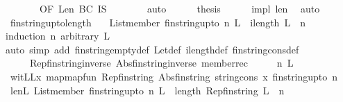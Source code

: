 \begin{isabellebody}
\ \ \ \ \ \ {\isacharcomma}\ OF\ Len\ BC\ IS{\isacharbrackright}\isanewline
\ \ \ \ \ \ \isamarkupfalse%
\ auto\isanewline
\ \ \ \ \isamarkupfalse%
\ {\isacharquery}thesis\isanewline
\ \ \ \ \isamarkupfalse%
\ impl\ len\ \isamarkupfalse%
\ auto\isanewline
{}\isamarkupfalse%
%
\endisatagproof
{\isafoldproof}%
%
\isadelimproof
\isanewline
%
\endisadelimproof
\isanewline
\isanewline
{}\isamarkupfalse%
\ fin{\isacharunderscore}string{\isacharunderscore}upto{\isacharunderscore}length{\isacharcolon}\isanewline
\ \ \ {\isachardoublequoteopen}List{\isachardot}member\ {\isacharparenleft}fin{\isacharunderscore}string{\isacharunderscore}upto\ n{\isacharparenright}\ L\ {\isasymLongrightarrow}\ ilength\ L\ {\isasymle}\ n{\isachardoublequoteclose}\isanewline
%
\isadelimproof
\ \ %
\endisadelimproof
%
\isatagproof
{}\isamarkupfalse%
{\isacharparenleft}induction\ n\ arbitrary{\isacharcolon}\ L{\isacharparenright}\isanewline
\ \ \ \isamarkupfalse%
{\isacharparenleft}auto\ simp\ add{\isacharcolon}\ fin{\isacharunderscore}string{\isacharunderscore}empty{\isacharunderscore}def\ Let{\isacharunderscore}def\ ilength{\isacharunderscore}def\ fin{\isacharunderscore}string{\isacharunderscore}cons{\isacharunderscore}def\ \isanewline
\ \ \ \ \ Rep{\isacharunderscore}fin{\isacharunderscore}string{\isacharunderscore}inverse\ Abs{\isacharunderscore}fin{\isacharunderscore}string{\isacharunderscore}inverse\ member{\isacharunderscore}rec{\isacharparenright}\isanewline
{}\isamarkupfalse%
\ {\isacharminus}\isanewline
\ \ \isamarkupfalse%
\ n\ L\isanewline
\ \ \isamarkupfalse%
\ {\isacharquery}witLL{\isacharequal}{\isachardoublequoteopen}{\isacharparenleft}{\isasymlambda}x{\isachardot}\ map{\isacharparenleft}map{\isacharunderscore}fun\ Rep{\isacharunderscore}fin{\isacharunderscore}string\ Abs{\isacharunderscore}fin{\isacharunderscore}string\ {\isacharparenleft}string{\isacharunderscore}cons\ x{\isacharparenright}{\isacharparenright}\ {\isacharparenleft}fin{\isacharunderscore}string{\isacharunderscore}upto\ n{\isacharparenright}{\isacharparenright}{\isachardoublequoteclose}\isanewline
\ \ \isamarkupfalse%
\ len{\isacharcolon}{\isachardoublequoteopen}{\isacharparenleft}{\isasymAnd}L{\isachardot}\ List{\isachardot}member\ {\isacharparenleft}fin{\isacharunderscore}string{\isacharunderscore}upto\ n{\isacharparenright}\ L\ {\isasymLongrightarrow}\ length\ {\isacharparenleft}Rep{\isacharunderscore}fin{\isacharunderscore}string\ L{\isacharparenright}\ {\isasymle}\ n{\isacharparenright}{\isachardoublequoteclose}\isanewline

\end{isabellebody}
